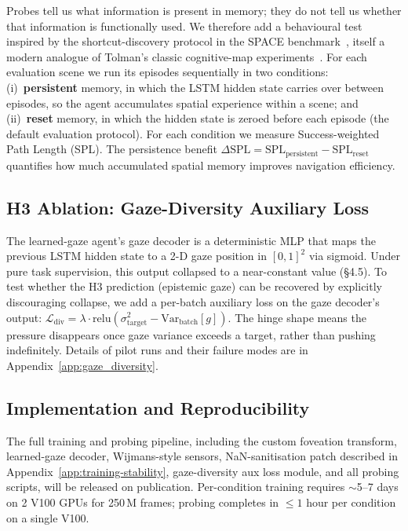 \documentclass[10pt,conference,compsocconf]{IEEEtran}
\begin{document}
Probes tell us what information is present in memory; they do not tell us whether that information is functionally used. We therefore add a behavioural test inspired by the shortcut-discovery protocol in the SPACE benchmark~\cite{ramakrishnan2025space}, itself a modern analogue of Tolman's classic cognitive-map experiments~\cite{tolman1948cognitive}. For each evaluation scene we run its episodes sequentially in two conditions: (i)~\textbf{persistent} memory, in which the LSTM hidden state carries over between episodes, so the agent accumulates spatial experience within a scene; and (ii)~\textbf{reset} memory, in which the hidden state is zeroed before each episode (the default evaluation protocol). For each condition we measure Success-weighted Path Length (SPL). The persistence benefit $\Delta\text{SPL} = \text{SPL}_\text{persistent} - \text{SPL}_\text{reset}$ quantifies how much accumulated spatial memory improves navigation efficiency.

\subsection{H3 Ablation: Gaze-Diversity Auxiliary Loss}

The learned-gaze agent's gaze decoder is a deterministic MLP that maps the previous LSTM hidden state to a 2-D gaze position in $[0,1]^2$ via sigmoid. Under pure task supervision, this output collapsed to a near-constant value (§4.5). To test whether the H3 prediction (epistemic gaze) can be recovered by explicitly discouraging collapse, we add a per-batch auxiliary loss on the gaze decoder's output: $\mathcal{L}_\text{div} = \lambda \cdot \text{relu}(\sigma^2_\text{target} - \text{Var}_\text{batch}[g])$. The hinge shape means the pressure disappears once gaze variance exceeds a target, rather than pushing indefinitely. Details of pilot runs and their failure modes are in Appendix~\ref{app:gaze_diversity}.

\subsection{Implementation and Reproducibility}

The full training and probing pipeline, including the custom foveation transform, learned-gaze decoder, Wijmans-style sensors, NaN-sanitisation patch described in Appendix~\ref{app:training-stability}, gaze-diversity aux loss module, and all probing scripts, will be released on publication. Per-condition training requires $\sim$5--7 days on 2 V100 GPUs for 250\,M frames; probing completes in $\leq 1$ hour per condition on a single V100.
\end{document}
